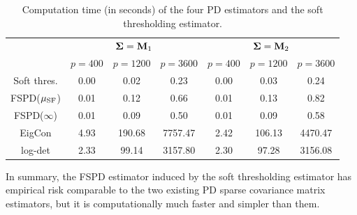 \documentclass[times,sort&compress,3p]{elsarticle}
\begin{document}
\begin{table}[htb!]
\begin{center}
\begin{tabular}{c|ccc|ccc}
\hline
&  \multicolumn{3}{c|}{${\bf \Sigma} = {\bf M}_1$}& \multicolumn{3}{c}{${\bf \Sigma} = {\bf M}_2$} \\
 & $p=400$ & $p=1200$ & $p=3600$ & $p=400$ & $p=1200$ & $p=3600$ \\
 \hline
Soft thres. & 0.00  & 0.02  &0.23  &0.00 &0.03 &0.24  \\
FSPD($\mu_{\rm SF}$) & 0.01 & 0.12  & 0.66 & 0.01 & 0.13 & 0.82 \\
FSPD($\infty$) & 0.01 & 0.09  & 0.50 & 0.01 & 0.09 & 0.58 \\
EigCon  & 4.93 & 190.68  & 7757.47 & 2.42 & 106.13 & 4470.47 \\
log-det & 2.33 & 99.14  & 3157.80 & 2.30 & 97.28 & 3156.08 \\
\hline
\end{tabular}
\caption{Computation time (in seconds) of the four PD estimators and the soft thresholding
estimator.}
\label{table:timecomp}
\end{center}
\end{table}

In summary, the FSPD estimator induced by the soft thresholding estimator has empirical risk 
comparable to the two existing PD sparse covariance matrix estimators, but it is computationally 
much faster and simpler than them.
\end{document}
